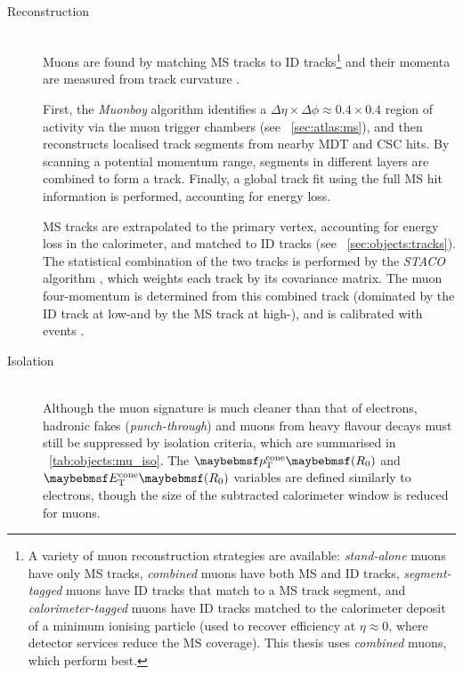 \begin{description}
\item[Reconstruction] \hfill \\
	Muons are found by matching MS tracks to ID tracks\footnote{
		A variety of muon reconstruction strategies are available: \textit{stand-alone} 
		muons have only MS tracks, \textit{combined} muons have both MS and 
		ID tracks, \textit{segment-tagged} muons have ID tracks that match to a 
		MS track segment, and \textit{calorimeter-tagged} muons have ID 
		tracks matched to the calorimeter deposit of a minimum ionising particle (used to 
		recover efficiency at $\eta \approx 0$, where detector services reduce the MS 
		coverage). This thesis uses \textit{combined} muons, which perform best.
	}
	and their momenta are measured from track curvature \cite{ATLAS:ExpectPerf}.

	First, the \textit{Muonboy} algorithm \cite{Muons:algorithms} identifies a 
	$\Delta\eta \times \Delta\phi \approx 0.4 \times 0.4$ region of activity via the muon 
	trigger chambers (see \Section~\ref{sec:atlas:ms}), and then reconstructs localised track 
	segments from nearby MDT and CSC hits. By scanning a potential momentum 
	range, segments in different layers are combined to form a track. Finally, a global 
	track fit using the full MS hit information is performed, accounting for energy 
	loss.

	MS tracks are extrapolated to the primary vertex, accounting for energy loss in 
	the calorimeter, and matched to ID tracks (see 
	\Section~\ref{sec:objects:tracks}). The statistical combination of the two 
	tracks is performed by the \textit{STACO} algorithm \cite{Muons:algorithms}, which
	weights each track by its covariance matrix. The muon four-momentum is determined 
	from this combined track (dominated by the ID track at low-\pt and by the 
	MS track at high-\pt), and is calibrated with \HepProcess{\PZ \HepTo \Pmu\Pmu}
	events \cite{Muons:2012}.

\item[Isolation] \hfill \\
	Although the muon signature is much cleaner than that of electrons, hadronic fakes 
	(\textit{punch-through}) and muons from heavy flavour decays must still be suppressed 
	by isolation criteria, which are summarised in \Table~\ref{tab:objects:mu_iso}. The 
	$\ptcone{R_0}$ and $\etcone{R_0}$ variables are defined similarly to electrons, 
	though the size of the subtracted calorimeter window is reduced for muons.


\end{description}
